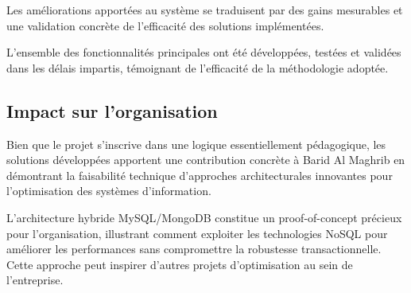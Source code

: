 Les améliorations apportées au système se traduisent par des gains mesurables et une validation concrète de l'efficacité des solutions implémentées.

\begin{table}[H]
\centering
\caption{Résultats quantifiés du projet d'optimisation}
\label{tab:resultats_quantifies}
\end{table}


L'ensemble des fonctionnalités principales ont été développées, testées et validées dans les délais impartis, témoignant de l'efficacité de la méthodologie adoptée.

\subsection{Impact sur l'organisation}

Bien que le projet s'inscrive dans une logique essentiellement pédagogique, les solutions développées apportent une contribution concrète à Barid Al Maghrib en démontrant la faisabilité technique d'approches architecturales innovantes pour l'optimisation des systèmes d'information.

L'architecture hybride MySQL/MongoDB constitue un proof-of-concept précieux pour l'organisation, illustrant comment exploiter les technologies NoSQL pour améliorer les performances sans compromettre la robustesse transactionnelle. Cette approche peut inspirer d'autres projets d'optimisation au sein de l'entreprise.

